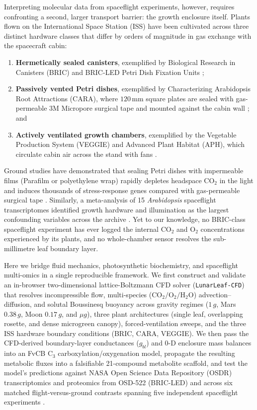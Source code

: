 \documentclass[final,5p,times,twocolumn,numbers,sort&compress]{elsarticle}
\begin{document}
Interpreting molecular data from spaceflight experiments, however, requires confronting a second, larger transport barrier: the growth enclosure itself. Plants flown on the International Space Station (ISS) have been cultivated across three distinct hardware classes that differ by orders of magnitude in gas exchange with the spacecraft cabin:
\begin{enumerate}
    \item \textbf{Hermetically sealed canisters}, exemplified by Biological Research in Canisters (BRIC) and BRIC-LED Petri Dish Fixation Units \citep{correll2013,osd522};
    \item \textbf{Passively vented Petri dishes}, exemplified by Characterizing Arabidopsis Root Attractions (CARA), where $120\,\mathrm{mm}$ square plates are sealed with gas-permeable $3\mathrm{M}$ Micropore surgical tape and mounted against the cabin wall \citep{cara,osd678}; and
    \item \textbf{Actively ventilated growth chambers}, exemplified by the Vegetable Production System (VEGGIE) and Advanced Plant Habitat (APH), which circulate cabin air across the stand with fans \citep{osd427}.
\end{enumerate}
Ground studies have demonstrated that sealing Petri dishes with impermeable films (Parafilm or polyethylene wrap) rapidly depletes headspace $\mathrm{CO_2}$ in the light and induces thousands of stress-response genes compared with gas-permeable surgical tape \citep{parafilm,sealingfilm}. Similarly, a meta-analysis of 15 \textit{Arabidopsis} spaceflight transcriptomes identified growth hardware and illumination as the largest confounding variables across the archive \citep{barker2023}. Yet to our knowledge, no BRIC-class spaceflight experiment has ever logged the internal $\mathrm{CO_2}$ and $\mathrm{O_2}$ concentrations experienced by its plants, and no whole-chamber sensor resolves the sub-millimetre leaf boundary layer.

Here we bridge fluid mechanics, photosynthetic biochemistry, and spaceflight multi-omics in a single reproducible framework. We first construct and validate an in-browser two-dimensional lattice-Boltzmann CFD solver (\texttt{LunarLeaf-CFD}) that resolves incompressible flow, multi-species ($\mathrm{CO_2/O_2/H_2O}$) advection--diffusion, and solutal Boussinesq buoyancy across gravity regimes ($1\,g$, Mars $0.38\,g$, Moon $0.17\,g$, and $\mu g$), three plant architectures (single leaf, overlapping rosette, and dense microgreen canopy), forced-ventilation sweeps, and the three ISS hardware boundary conditions (BRIC, CARA, VEGGIE). We then pass the CFD-derived boundary-layer conductances ($g_{bl}$) and 0-D enclosure mass balances into an FvCB $\mathrm{C_3}$ carboxylation/oxygenation model, propagate the resulting metabolic fluxes into a falsifiable 21-compound metabolite scaffold, and test the model's predictions against NASA Open Science Data Repository (OSDR) transcriptomics and proteomics from OSD-522 (BRIC-LED) \citep{osd522} and across six matched flight-versus-ground contrasts spanning five independent spaceflight experiments \citep{osd522,osd38,osd321,osd678,osd427}.
\end{document}
